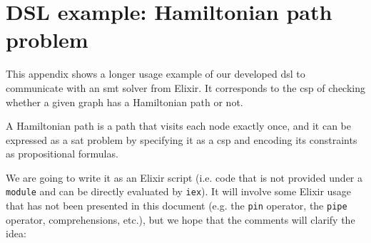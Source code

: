 \chapter{DSL example: Hamiltonian path problem}
\label{Appendix:hamiltonian}

This appendix shows a longer usage example of our developed \gls{dsl} to 
communicate with an \acrshort{smt} solver from Elixir. It corresponds to the
\gls{csp} of checking whether a given graph has a Hamiltonian path or not.

A Hamiltonian path is a path that visits each node exactly once, and it can be 
expressed as a \gls{sat} problem by specifying it as a \gls{csp} and encoding 
its constraints as propositional formulas.

We are going to write it as an Elixir script (i.e. code that is not provided 
under a \verb|module| and can be directly evaluated by \verb|iex|). It will
involve some Elixir usage that has not been presented in this document (e.g. 
the \verb|pin| operator, the \verb|pipe| operator, comprehensions, etc.), but we
hope that the comments will clarify the idea:

